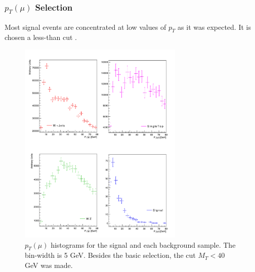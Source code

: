 \documentclass{beamer}
\begin{document}
\begin{frame}
\frametitle{$p_T(\mu)$ Selection}

\begin{justify}
	{\scriptsize Most signal events are concentrated at low values of $p_T$ as it was expected. It is chosen a less-than cut .}
\end{justify}

\begin{figure}[!h]
	
	\centering
	\includegraphics[width=0.7\textwidth, height=0.6\textheight]{pictures/Selection/P_TMu/All-P_TMu}
	\caption{{\scriptsize $p_T(\mu)$ histograms for the signal and each background sample. The bin-width is 5 GeV. Besides the basic selection, the cut $M_T<40$ GeV was made.}}
	\label{P_TMu}
	
\end{figure}


\end{frame}

\end{document}
